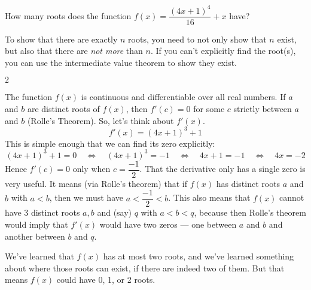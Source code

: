 \begin{question}
How many roots does the function $f(x)=\dfrac{(4x+1)^4}{16}+x$ have?
\end{question}
\begin{hint}
To show that there are exactly $n$ roots, you need to not only show that $n$ exist, but also that there are \emph{not more} than $n$.
If you can't explicitly find the root(s), you can use the intermediate value theorem to show they exist.
\end{hint}
\begin{answer}
$2$
\end{answer}
\begin{solution}
The function $f(x)$ is continuous and differentiable over all real numbers.
If $a$ and $b$ are distinct roots of $f(x)$, then $f'(c)=0$ for some $c$ strictly between $a$ and $b$ (Rolle's Theorem). So, let's think about $f'(x)$.
\[f'(x)=(4x+1)^3+1\]
This is simple enough that we can find its zero explicitly:
\[(4x+1)^3 +1= 0
\quad \Leftrightarrow \quad
(4x+1)^3 = -1
\quad \Leftrightarrow \quad
4x+1 = -1
\quad \Leftrightarrow \quad
4x=-2
\]
Hence $f'(c)=0$ only when $c=\dfrac{-1}{2}$. That the derivative only has a single zero is very
useful. It means (via Rolle's theorem) that if $f(x)$ has distinct roots $a$ and $b$ with $a<b$,
then we must have $a < \dfrac{-1}{2} < b$.  This also means that $f(x)$ cannot have 3 distinct
roots $a,b$ and (say) $q$ with $a<b<q$, because then Rolle's theorem would imply that $f'(x)$ would
have two zeros --- one between $a$ and $b$ and another between $b$ and $q$.


We've learned that $f(x)$ has at most two roots, and we've learned something about where those roots can exist, if there are indeed two of them. But that means $f(x)$ could have 0, 1, or 2 roots.



\end{solution}
